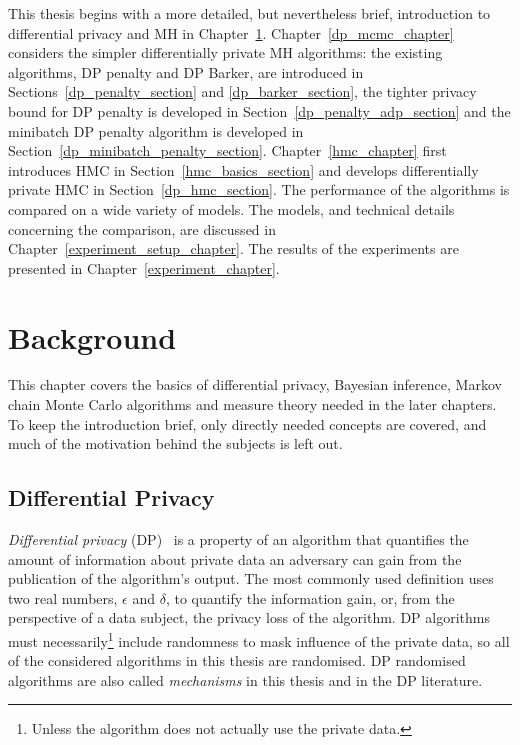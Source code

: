 \documentclass[english,twoside,openright]{HYgraduMLDS}
\begin{document}
This thesis begins with a more detailed, but nevertheless brief, introduction to
differential privacy and MH in Chapter~\ref{background_chapter}.
Chapter~\ref{dp_mcmc_chapter} considers the simpler differentially private
MH algorithms: the existing algorithms, DP penalty and DP Barker, are introduced
in Sections~\ref{dp_penalty_section} and \ref{dp_barker_section},
the tighter privacy bound for DP penalty is developed in
Section~\ref{dp_penalty_adp_section}
and the minibatch DP penalty algorithm is developed in
Section~\ref{dp_minibatch_penalty_section}. Chapter~\ref{hmc_chapter} first
introduces HMC in Section~\ref{hmc_basics_section} and develops differentially
private HMC in Section~\ref{dp_hmc_section}. The performance of the algorithms
is compared on a wide variety of models. The models, and technical details
concerning the comparison, are discussed in Chapter~\ref{experiment_setup_chapter}.
The results of the experiments are presented in Chapter~\ref{experiment_chapter}.

\chapter{Background}\label{background_chapter}

This chapter covers the basics of differential privacy, Bayesian inference,
Markov chain Monte Carlo algorithms and measure theory
needed in the later chapters. To keep
the introduction brief, only directly needed concepts are covered, and much
of the motivation behind the subjects is left out.

\section{Differential Privacy}\label{DP_background}
\emph{Differential privacy} (DP)~\cite{DMN06, DwR14} is a property of
an algorithm that quantifies the
amount of information about private data an adversary can gain from the 
publication of the algorithm's output.
The most commonly used definition uses two real numbers, 
\(\epsilon\) and \(\delta\), to quantify the information gain, or, from the 
perspective of a data subject, the privacy loss of the algorithm.
DP algorithms must necessarily\footnote{Unless the algorithm does not
actually use the private data.} include randomness to mask influence of the
private data, so all of the considered algorithms in this thesis are randomised.
DP randomised algorithms are also called \emph{mechanisms} in this thesis and in the
DP literature.
\end{document}
